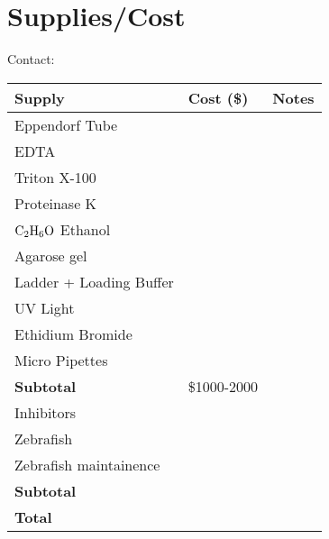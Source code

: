 \documentclass{scrartcl}
\begin{document}
\section{Supplies/Cost}
\label{sec:org3f63f83}
Contact:
\begin{center}
\begin{tabular}{lll}
\toprule
Supply & Cost (\$) & Notes\\
\midrule
Eppendorf Tube &  & \\
EDTA &  & \\
Triton X-100 &  & \\
Proteinase K &  & \\
\(\ce{C2H6O}\) Ethanol &  & \\
Agarose gel &  & \\
Ladder + Loading Buffer &  & \\
UV Light &  & \\
Ethidium Bromide &  & \\
Micro Pipettes &  & \\
\textbf{Subtotal} & \$1000-2000 & \\
Inhibitors &  & \\
Zebrafish &  & \\
Zebrafish maintainence &  & \\
\textbf{Subtotal} &  & \\
\textbf{Total} &  & \\
\bottomrule
\end{tabular}
\end{center}
\end{document}
